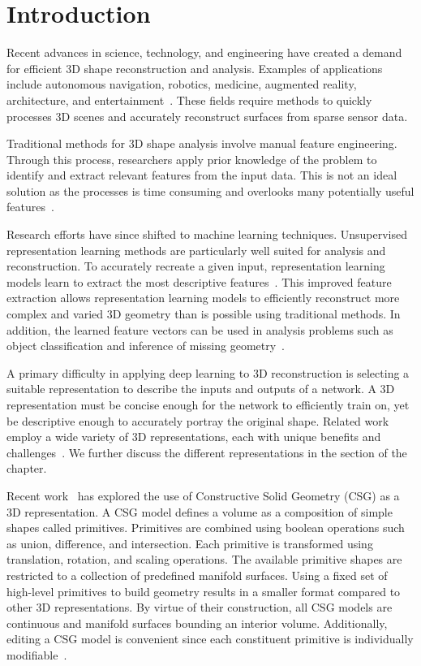 
\chapter{Introduction}
\label{chap:introduction}

Recent advances in science, technology, and engineering have created a demand for efficient 3D shape reconstruction and analysis. Examples of applications include autonomous navigation, robotics, medicine, augmented reality, architecture, and entertainment~\cite{Xiao2020, Xie2022}. These fields require methods to quickly processes 3D scenes and accurately reconstruct surfaces from sparse sensor data.

Traditional methods for 3D shape analysis involve manual feature engineering. Through this process, researchers apply prior knowledge of the problem to identify and extract relevant features from the input data. This is not an ideal solution as the processes is time consuming and overlooks many potentially useful features~\cite{Bengio2013}.

Research efforts have since shifted to machine learning techniques. Unsupervised representation learning methods are particularly well suited for analysis and reconstruction. To accurately recreate a given input, representation learning models learn to extract the most descriptive features~\cite{Bengio2013}. This improved feature extraction allows representation learning models to efficiently reconstruct more complex and varied 3D geometry than is possible using traditional methods. In addition, the learned feature vectors can be used in analysis problems such as object classification and inference of missing geometry~\cite{Park2019}.

A primary difficulty in applying deep learning to 3D reconstruction is selecting a suitable representation to describe the inputs and outputs of a network. A 3D representation must be concise enough for the network to efficiently train on, yet be descriptive enough to accurately portray the original shape. Related work employ a wide variety of 3D representations, each with unique benefits and challenges~\cite{Xiao2020}. We further discuss the different representations in the  section of the  chapter.

Recent work~\cite{Sharma2018, Kania2020, Ren2021} has explored the use of Constructive Solid Geometry (CSG) as a 3D representation. A CSG model defines a volume as a composition of simple shapes called primitives. Primitives are combined using boolean operations such as union, difference, and intersection. Each primitive is transformed using translation, rotation, and scaling operations. The available primitive shapes are restricted to a collection of predefined manifold surfaces. Using a fixed set of high-level primitives to build geometry results in a smaller format compared to other 3D representations. By virtue of their construction, all CSG models are continuous and manifold surfaces bounding an interior volume. Additionally, editing a CSG model is convenient since each constituent primitive is individually modifiable~\cite{Hughes2013}.

